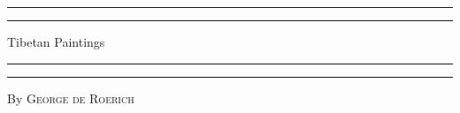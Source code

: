\documentclass[a4paper, 12pt, oneside]{article}
\begin{document}
\renewcommand\thefootnote{{\bfseries\color{customColor}{\arabic{footnote}}}}
\let\oldfootnote\footnote
    \renewcommand{\footnote}[1]{\oldfootnote{{\bfseries\color{customColor}#1}}}
\bfseries    
\begin{titlepage} %
	\centering %
	\scshape %

	
	\rule{\textwidth}{1.6pt}\vspace*{-\baselineskip}\vspace*{2pt} %
	\rule{\textwidth}{0.4pt} %
	
	\vspace{0.75\baselineskip} %
	
	{\LARGE Tibetan Paintings} %
	
	\vspace{0.75\baselineskip} %
	
	\rule{\textwidth}{0.4pt}\vspace*{-\baselineskip}\vspace{3.2pt} %
	\rule{\textwidth}{1.6pt} %
	
	\vspace{1\baselineskip} %
	
	
	{By \scshape\Large George de Roerich} %
	
	\vspace*{1\baselineskip} %
	
	
	\vspace{1\baselineskip} %

	
	
		

\end{titlepage}
\end{document}
